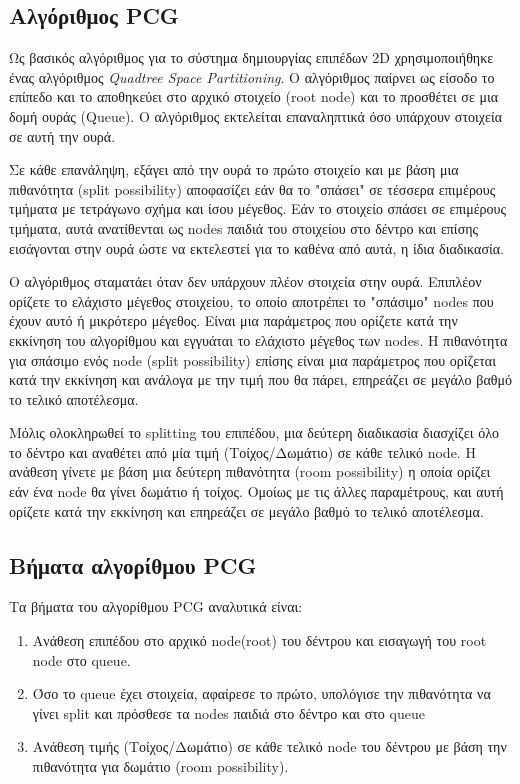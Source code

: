 \subsection{Αλγόριθμος PCG}
Ως βασικός αλγόριθμος για το σύστημα δημιουργίας επιπέδων 2D χρησιμοποιήθηκε ένας αλγόριθμος \textit{Quadtree Space Partitioning}. O αλγόριθμος παίρνει ως είσοδο το επίπεδο και το αποθηκεύει στο αρχικό στοιχείο (root node) και το προσθέτει σε μια δομή ουράς (Queue). Ο αλγόριθμος εκτελείται επαναληπτικά όσο υπάρχουν στοιχεία σε αυτή την ουρά.
\par
Σε κάθε επανάληψη, εξάγει από την ουρά το πρώτο στοιχείο και με βάση μια πιθανότητα (split possibility) αποφασίζει εάν θα το "σπάσει" σε τέσσερα επιμέρους τμήματα με τετράγωνο σχήμα και ίσου μέγεθος. Εάν το στοιχείο σπάσει σε επιμέρους τμήματα, αυτά ανατίθενται ως nodes παιδιά του στοιχείου στο δέντρο και επίσης εισάγονται στην ουρά ώστε να εκτελεστεί για το καθένα από αυτά, η ίδια διαδικασία.
\par
Ο αλγόριθμος σταματάει όταν δεν υπάρχουν πλέον στοιχεία στην ουρά. Επιπλέον ορίζετε το ελάχιστο μέγεθος στοιχείου, το οποίο αποτρέπει το "σπάσιμο" nodes που έχουν αυτό ή μικρότερο μέγεθος. Είναι μια παράμετρος που ορίζετε κατά την εκκίνηση του αλγορίθμου και εγγυάται το ελάχιστο μέγεθος των nodes. Η πιθανότητα για σπάσιμο ενός node (split possibility) επίσης είναι μια παράμετρος που ορίζεται κατά την εκκίνηση και ανάλογα με την τιμή που θα πάρει, επηρεάζει σε μεγάλο βαθμό το τελικό αποτέλεσμα.
\par
Μόλις ολοκληρωθεί το splitting του επιπέδου, μια δεύτερη διαδικασία διασχίζει όλο το δέντρο και αναθέτει από μία τιμή (Τοίχος/Δωμάτιο) σε κάθε τελικό node. Η ανάθεση γίνετε με βάση μια δεύτερη πιθανότητα (room possibility) η οποία ορίζει εάν ένα node θα γίνει δωμάτιο ή τοίχος. Ομοίως με τις άλλες παραμέτρους, και αυτή ορίζετε κατά την εκκίνηση και επηρεάζει σε μεγάλο βαθμό το τελικό αποτέλεσμα.

\subsection{Βήματα αλγορίθμου PCG}
Τα βήματα του αλγορίθμου PCG αναλυτικά είναι:

\begin{enumerate}
	\item Ανάθεση επιπέδου στο αρχικό node(root) του δέντρου και εισαγωγή του root node στο queue.
	\item Όσο το queue έχει στοιχεία, αφαίρεσε το πρώτο, υπολόγισε την πιθανότητα να γίνει split και πρόσθεσε τα nodes παιδιά στο δέντρο και στο queue
	\item Ανάθεση τιμής (Τοίχος/Δωμάτιο) σε κάθε τελικό node του δέντρου με βάση την πιθανότητα για δωμάτιο (room possibility).
\end{enumerate}


